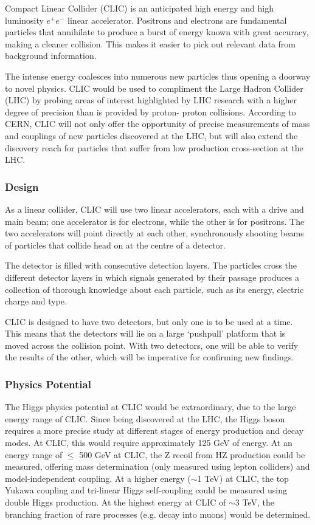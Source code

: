 Compact Linear Collider (CLIC) is an anticipated high energy and high luminosity $e^+ e^-$ linear accelerator. Positrons and electrons are fundamental particles that annihilate to produce a burst of energy known with great accuracy, making a cleaner collision. This makes it easier to pick out relevant data from background information.

The intense energy coalesces into numerous new particles thus opening a doorway to novel physics. CLIC would be used to compliment the Large Hadron Collider (LHC) by probing areas of interest highlighted by LHC research with a higher degree of precision than is provided by proton- proton collisions. According to CERN, CLIC will not only offer the opportunity of precise measurements of mass and couplings of new particles discovered at the LHC, but will also extend the discovery reach for particles that suffer from low production cross-section at the LHC. \cite{LHC:CP:Higgs}

\subsubsection{Design}

As a linear collider, CLIC will use two linear accelerators, each with a drive and main beam; one accelerator is for electrons, while the other is for positrons. The two accelerators will point directly at each other, synchronously shooting beams of particles that collide head on at the centre of a detector.

The detector is filled with consecutive detection layers. The particles cross the different detector layers in which signals generated by their passage produces a collection of thorough knowledge about each particle, such as its energy, electric charge and type.

CLIC is designed to have two detectors, but only one is to be used at a time. This means that the detectors will lie on a large `push\textendash pull' platform that is moved across the collision point. With two detectors, one will be able to verify the results of the other, which will be imperative for confirming new findings.

\subsubsection{Physics Potential}
 
The Higgs physics potential at CLIC would be extraordinary, due to the large energy range of CLIC. Since being discovered at the LHC, the Higgs boson requires a more precise study at different stages of energy production and decay modes. At CLIC, this would require approximately 125 GeV of energy. At an energy range of $\leq$ 500 GeV at CLIC, the Z recoil from HZ production could be measured, offering mass determination (only measured using lepton colliders) and model-independent coupling. At a higher energy ($\sim$1 TeV) at CLIC, the top Yukawa coupling and tri-linear Higgs self-coupling could be measured using double Higgs production.
At the highest energy at CLIC of $\sim$3 TeV, the branching fraction of rare processes (e.g. decay into muons) would be determined.
 
